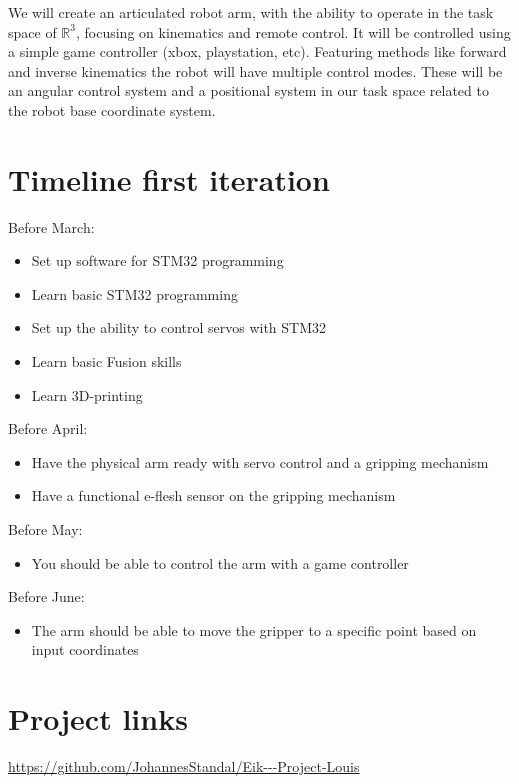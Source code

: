 \documentclass[a4paper,12pt]{article}
\begin{document}
We will create an articulated robot arm, with the 
ability to operate in the task space of $\mathbb{R}^3$, focusing on kinematics and remote control.
It will be controlled using a simple game controller (xbox, playstation, etc). 
Featuring methods like forward and inverse kinematics the robot will have multiple 
control modes. These will be an angular control system and a positional system in our task space
related to the robot base coordinate system.

\section{Timeline first iteration}
Before March:
\begin{itemize}
  \item Set up software for STM32 programming
  \item Learn basic STM32 programming
  \item Set up the ability to control servos with STM32
  \item Learn basic Fusion skills
  \item Learn 3D-printing
\end{itemize}

Before April:
\begin{itemize}
  \item Have the physical arm ready with servo control and a gripping mechanism
  \item Have a functional e-flesh sensor on the gripping mechanism
\end{itemize}

Before May:
\begin{itemize}
  \item You should be able to control the arm with a game controller
\end{itemize}

Before June:
\begin{itemize}
  \item The arm should be able to move the gripper to a specific point based on input coordinates
\end{itemize}

\section{Project links}
\url{https://github.com/JohannesStandal/Eik---Project-Louis}

\printbibliography
\end{document}
